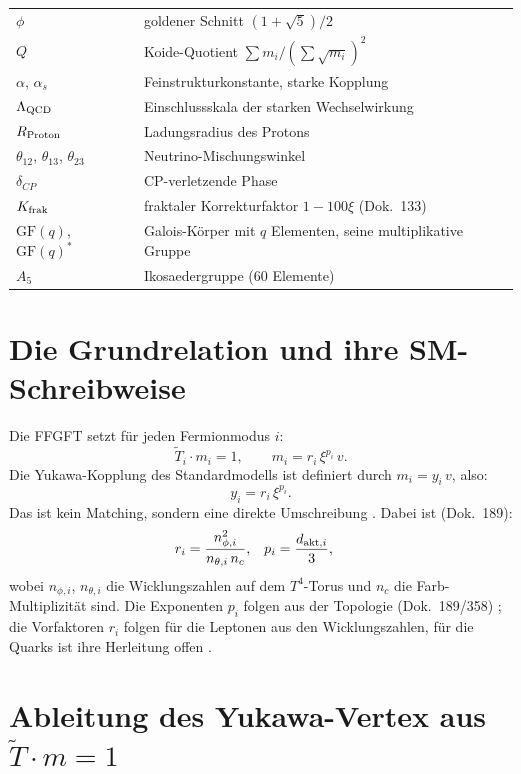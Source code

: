 \begin{tabular}{@{}lp{9cm}@{}}
$\phi$ & goldener Schnitt $(1+\sqrt5)/2$ \\
$Q$ & Koide-Quotient $\sum m_i/(\sum\sqrt{m_i})^2$ \\
$\alpha$, $\alpha_s$ & Feinstrukturkonstante, starke Kopplung \\
$\Lambda_{\rm QCD}$ & Einschlussskala der starken Wechselwirkung \\
$R_{\rm Proton}$ & Ladungsradius des Protons \\
$\theta_{12}$, $\theta_{13}$, $\theta_{23}$ & Neutrino-Mischungswinkel \\
$\delta_{CP}$ & CP-verletzende Phase \\
$K_{\rm frak}$ & fraktaler Korrekturfaktor $1-100\xi$ (Dok.~133) \\
$\mathrm{GF}(q)$, $\mathrm{GF}(q)^*$ & Galois-Körper mit $q$ Elementen, seine multiplikative Gruppe \\
$A_5$ & Ikosaedergruppe (60 Elemente) \\
\bottomrule
\end{tabular}

\section{Die Grundrelation und ihre SM-Schreibweise}

Die FFGFT setzt für jeden Fermionmodus $i$:
\begin{equation}
  \tilde T_i \cdot m_i = 1, \qquad
  m_i = r_i\,\xi^{p_i}\,v.
  \label{eq:T0}
\end{equation}
Die Yukawa-Kopplung des Standardmodells ist definiert durch
$m_i = y_i\,v$, also:
\begin{equation}
  \boxed{y_i = r_i\,\xi^{p_i}.}
  \label{eq:yuk_ffgft}
\end{equation}
Das ist kein Matching, sondern eine direkte Umschreibung \BM.
Dabei ist (Dok.~189):
\begin{align}
  r_i &= \frac{n_{\phi,i}^2}{n_{\theta,i}\,n_c},
  & p_i &= \frac{d_{{\rm akt},i}}{3},
\end{align}
wobei $n_{\phi,i}$, $n_{\theta,i}$ die Wicklungszahlen auf dem $T^4$-Torus
und $n_c$ die Farb-Multiplizität sind. Die Exponenten $p_i$ folgen aus der
Topologie (Dok.~189/358) \KM; die Vorfaktoren $r_i$ folgen für die Leptonen
aus den Wicklungszahlen, für die Quarks ist ihre Herleitung offen \SM.

\section{Ableitung des Yukawa-Vertex aus $\tilde T\cdot m = 1$}

